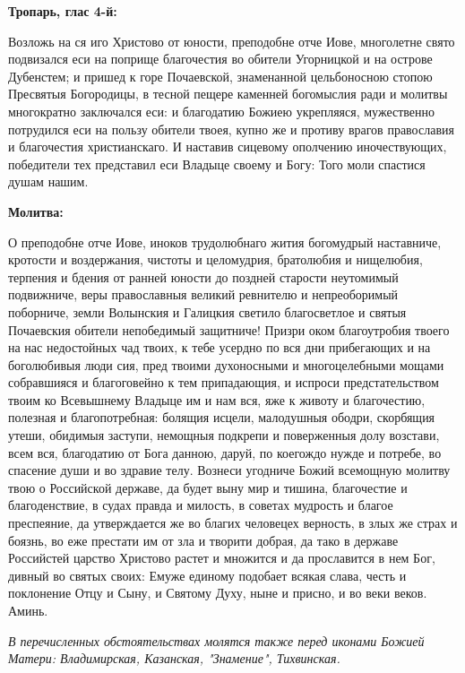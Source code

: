 
\bfseries Тропарь, глас 4-й:\normalfont{}


Возложь на ся иго Христово от юности, преподобне отче Иове, многолетне свято подвизался еси на поприще благочестия во обители Угорницкой и на острове Дубенстем; и пришед к горе Почаевской, знаменанной цельбоносною стопою Пресвятыя Богородицы, в тесной пещере каменней богомыслия ради и молитвы многократно заключался еси: и благодатию Божиею укрепляяся, мужественно потрудился еси на пользу обители твоея, купно же и противу врагов православия и благочестия христианскаго. И наставив сицевому ополчению иночествующих, победители тех представил еси Владыце своему и Богу: Того моли спастися душам нашим.


\medskip


\bfseries Молитва:\normalfont{}


О преподобне отче Иове, иноков трудолюбнаго жития богомудрый наставниче, кротости и воздержания, чистоты и целомудрия, братолюбия и нищелюбия, терпения и бдения от ранней юности до поздней старости неутомимый подвижниче, веры православныя великий ревнителю и непреоборимый поборниче, земли Волынския и Галицкия светило благосветлое и святыя Почаевския обители непобедимый защитниче! Призри оком благоутробия твоего на нас недостойных чад твоих, к тебе усердно по вся дни прибегающих и на боголюбивыя люди сия, пред твоими духоносными и многоцелебными мощами собравшияся и благоговейно к тем припадающия, и испроси предстательством твоим ко Всевышнему Владыце им и нам вся, яже к животу и благочестию, полезная и благопотребная: болящия исцели, малодушныя ободри, скорбящия утеши, обидимыя заступи, немощныя подкрепи и поверженныя долу возстави, всем вся, благодатию от Бога данною, даруй, по коегождо нужде и потребе, во спасение души и во здравие телу. Вознеси угодниче Божий всемощную молитву твою о Российской державе, да будет выну мир и тишина, благочестие и благоденствие, в судах правда и милость, в советах мудрость и благое преспеяние, да утверждается же во благих человецех верность, в злых же страх и боязнь, во еже престати им от зла и творити добрая, да тако в державе Российстей царство Христово растет и множится и да прославится в нем Бог, дивный во святых своих: Емуже единому подобает всякая слава, честь и поклонение Отцу и Сыну, и Святому Духу, ныне и присно, и во веки веков. Аминь.


\itshape В перечисленных обстоятельствах молятся также перед иконами Божией Матери: Владимирская, Казанская, "Знамение", Тихвинская.\normalfont{}


